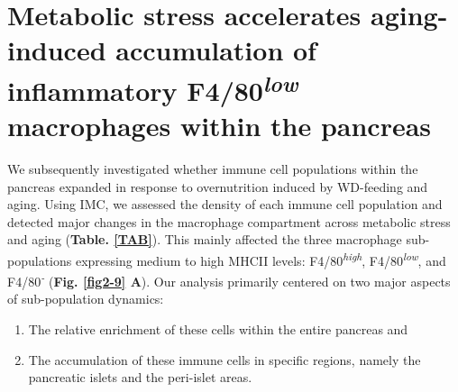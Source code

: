 
\section{Metabolic stress accelerates aging-induced accumulation of\\inflammatory F4/80\textsuperscript{\textit{low}} macrophages within the pancreas}
\label{sec:imc_acceleration}

We subsequently investigated whether immune cell populations within the pancreas expanded in response to overnutrition induced by WD-feeding and aging. Using IMC, we assessed the density of each immune cell population and detected major changes in the macrophage compartment across metabolic stress and aging (\textbf{Table. \ref{TAB}}). This mainly affected the three macrophage sub-populations expressing medium to high MHCII levels: F4/80\textsuperscript{\textit{high}}, F4/80\textsuperscript{\textit{low}}, and F4/80\textsuperscript{\textit{-}} (\textbf{Fig. \ref{fig2-9} A}). Our analysis primarily centered on two major aspects of sub-population dynamics: 
\begin{enumerate}
    \item The relative enrichment of these cells within the entire pancreas and
    \item The accumulation of these immune cells in specific regions, namely the pancreatic islets and the peri-islet areas.
\end{enumerate}

